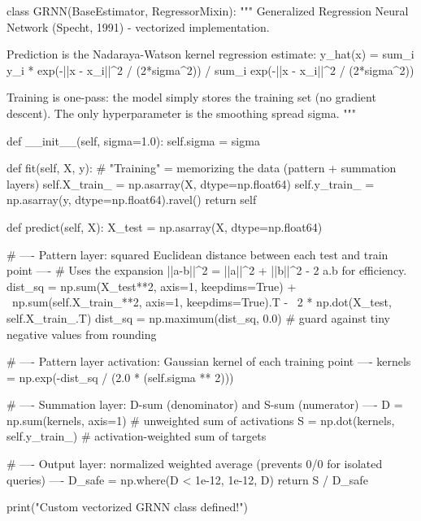 \begin{codebox}[title={GRNN class (from scratch)}]
class GRNN(BaseEstimator, RegressorMixin):
    """
    Generalized Regression Neural Network (Specht, 1991) - vectorized implementation.

    Prediction is the Nadaraya-Watson kernel regression estimate:
        y_hat(x) = sum_i y_i * exp(-||x - x_i||^2 / (2*sigma^2))
                 / sum_i     exp(-||x - x_i||^2 / (2*sigma^2))

    Training is one-pass: the model simply stores the training set (no gradient descent).
    The only hyperparameter is the smoothing spread sigma.
    """

    def __init__(self, sigma=1.0):
        self.sigma = sigma

    def fit(self, X, y):
        # "Training" = memorizing the data (pattern + summation layers)
        self.X_train_ = np.asarray(X, dtype=np.float64)
        self.y_train_ = np.asarray(y, dtype=np.float64).ravel()
        return self

    def predict(self, X):
        X_test = np.asarray(X, dtype=np.float64)

        # ---- Pattern layer: squared Euclidean distance between each test and train point ----
        # Uses the expansion ||a-b||^2 = ||a||^2 + ||b||^2 - 2 a.b for efficiency.
        dist_sq = np.sum(X_test**2, axis=1, keepdims=True) + \
                  np.sum(self.X_train_**2, axis=1, keepdims=True).T - \
                  2 * np.dot(X_test, self.X_train_.T)
        dist_sq = np.maximum(dist_sq, 0.0)  # guard against tiny negative values from rounding

        # ---- Pattern layer activation: Gaussian kernel of each training point ----
        kernels = np.exp(-dist_sq / (2.0 * (self.sigma ** 2)))

        # ---- Summation layer: D-sum (denominator) and S-sum (numerator) ----
        D = np.sum(kernels, axis=1)                 # unweighted sum of activations
        S = np.dot(kernels, self.y_train_)          # activation-weighted sum of targets

        # ---- Output layer: normalized weighted average (prevents 0/0 for isolated queries) ----
        D_safe = np.where(D < 1e-12, 1e-12, D)
        return S / D_safe


print("Custom vectorized GRNN class defined!")
\end{codebox}

